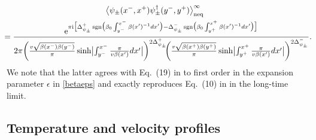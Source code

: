 \documentclass[12pt,a4paper]{article}
\newcommand{\ee}{{\rm e}}
\newcommand{\ii}{{\rm i}}
\def\sgn{\operatorname{sgn}}
\theoremstyle{definition}
\theoremstyle{remark}
\begin{document}
\begin{multline}
\hspace*{-0.2cm}\bigl\langle \psi_{\pm}(x^-,x^+)\psi^\dagger_{\pm}(y^-,y^+) 
\big\rangle^\infty_{\text{neq}} \\
{}\hspace*{-0.2cm}=	\frac{
		\ee^{\pi \ii \bigl[
			\Delta^{+}_{\psi_{\pm}}
				\sgn \bigl( \beta_0 \int_{y^{-}}^{x^{-}} \beta(x')^{-1} dx' \bigr)
			- \Delta^{-}_{\psi_{\pm}}
				\sgn \bigl( \beta_0 \int_{y^{+}}^{x^{+}} \beta(x')^{-1} dx' \bigr)
		\bigr]}
	}{
		2\pi\hspace{-0.05cm}
		\left(
			\frac{v\sqrt{\beta(x^-)\beta(y^-)}}{\pi}
			\sinh \bigl| \int_{y^{-}}^{x^{-}} \frac{\pi}{v\beta(x')}dx' \bigr|
		\right)^{2\Delta^{+}_{\psi_{\pm}}}\hspace{-0.15cm}
		\left(
			\frac{v\sqrt{\beta(x^+)\beta(y^+)}}{\pi}
			\sinh \bigl| \int_{y^{+}}^{x^{+}} \frac{\pi}{v\beta(x')}dx' \bigr|
		\right)^{2\Delta^{-}_{\psi_{\pm}}}
          }.\hspace*{-0.2cm}	
\end{multline}
%
We note that the latter agrees with Eq.\ (19) in \cite{LLMM2} to first order in the expansion parameter $\epsilon$ in \eqref{betaeps} and exactly reproduces Eq.\ (10) in \cite{LLMM2} in the long-time limit.


\subsection{Temperature and velocity profiles}
\label{subsec:4.2}
\end{document}
